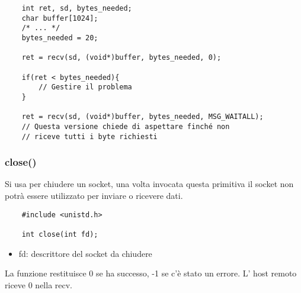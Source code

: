 \begin{verbatim}
    int ret, sd, bytes_needed;
    char buffer[1024];
    /* ... */
    bytes_needed = 20;

    ret = recv(sd, (void*)buffer, bytes_needed, 0);
    
    if(ret < bytes_needed){
        // Gestire il problema
    }

    ret = recv(sd, (void*)buffer, bytes_needed, MSG_WAITALL);
    // Questa versione chiede di aspettare finché non
    // riceve tutti i byte richiesti
\end{verbatim}

\subsubsection{close()}
Si usa per chiudere un socket, una volta invocata questa primitiva il socket non potrà essere utilizzato per inviare o ricevere dati.

\begin{verbatim}
    #include <unistd.h>
    
    int close(int fd);
\end{verbatim}
\begin{itemize}
    \item fd: descrittore del socket da chiudere
\end{itemize}
La funzione restituisce 0 se ha successo, -1 se c'è stato un errore.
L' host remoto riceve 0 nella recv.

